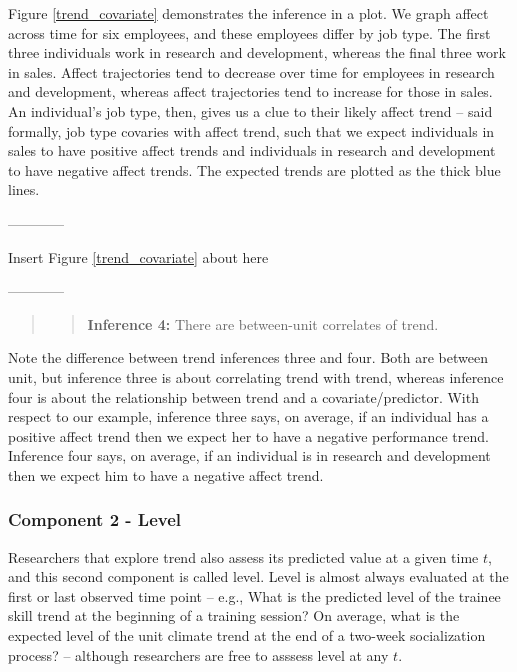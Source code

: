 \documentclass[english,,man]{apa6}
\theoremstyle{definition}
\theoremstyle{definition}
\theoremstyle{definition}
\theoremstyle{remark}
\begin{document}
Figure \ref{trend_covariate} demonstrates the inference in a plot. We
graph affect across time for six employees, and these employees differ
by job type. The first three individuals work in research and
development, whereas the final three work in sales. Affect trajectories
tend to decrease over time for employees in research and development,
whereas affect trajectories tend to increase for those in sales. An
individual's job type, then, gives us a clue to their likely affect
trend -- said formally, job type covaries with affect trend, such that
we expect individuals in sales to have positive affect trends and
individuals in research and development to have negative affect trends.
The expected trends are plotted as the thick blue lines.

\begin{center}

------------

Insert Figure \ref{trend_covariate} about here

------------

\end{center}

\begin{quote}
\begin{quote}
\textbf{Inference 4:} There are between-unit correlates of trend.
\end{quote}
\end{quote}

Note the difference between trend inferences three and four. Both are
between unit, but inference three is about correlating trend with trend,
whereas inference four is about the relationship between trend and a
covariate/predictor. With respect to our example, inference three says,
on average, if an individual has a positive affect trend then we expect
her to have a negative performance trend. Inference four says, on
average, if an individual is in research and development then we expect
him to have a negative affect trend.

\hypertarget{component-2---level}{%
\subsubsection{Component 2 - Level}\label{component-2---level}}

Researchers that explore trend also assess its predicted value at a
given time \(t\), and this second component is called level. Level is
almost always evaluated at the first or last observed time point --
e.g., What is the predicted level of the trainee skill trend at the
beginning of a training session? On average, what is the expected level
of the unit climate trend at the end of a two-week socialization
process? -- although researchers are free to asssess level at any \(t\).
\end{document}
